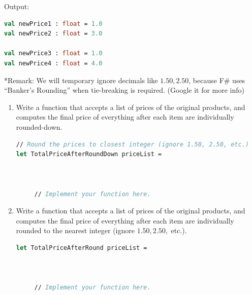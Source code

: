 \documentclass[12pt]{article}
\begin{document}
Output:
\begin{lstlisting}[language=FSharp]
val newPrice1 : float = 1.0
val newPrice2 : float = 3.0

val newPrice3 : float = 1.0
val newPrice4 : float = 4.0
\end{lstlisting}
*Remark: We will temporary ignore decimals like $1.50, 2.50$, because F\# uses ``Banker's Rounding'' when tie-breaking is required. (Google it for more info)
\begin{enumerate}
\item Write a function that accepts a list of prices of the original products, and computes the final price of everything after each item are individually rounded-down.
\begin{lstlisting}[language=FSharp]
// Round the prices to closest integer (ignore 1.50, 2.50, etc.)
let TotalPriceAfterRoundDown priceList =



     // Implement your function here.
\end{lstlisting}

\item Write a function that accepts a list of prices of the original products, and computes the final price of everything after each item are individually rounded to the nearest integer (ignore $1.50, 2.50,$ etc.).
\begin{lstlisting}[language=FSharp]
let TotalPriceAfterRound priceList =



     // Implement your function here.
\end{lstlisting}
\end{enumerate}

\pagebreak
\end{document}
